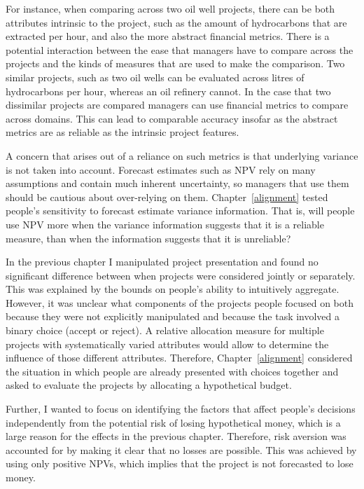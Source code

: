 \documentclass[a4paper, nobind, dvipsnames]{templates/ociamthesis}
\theoremstyle{definition}
\theoremstyle{definition}
\theoremstyle{definition}
\theoremstyle{definition}
\theoremstyle{remark}
\begin{document}
For instance, when comparing across two oil well projects, there can be both
attributes intrinsic to the project, such as the amount of hydrocarbons that are
extracted per hour, and also the more abstract financial metrics. There is a
potential interaction between the ease that managers have to compare across the
projects and the kinds of measures that are used to make the comparison. Two
similar projects, such as two oil wells can be evaluated across litres of
hydrocarbons per hour, whereas an oil refinery cannot. In the case that two
dissimilar projects are compared managers can use financial metrics to compare
across domains. This can lead to comparable accuracy insofar as the abstract
metrics are as reliable as the intrinsic project features.

A concern that arises out of a reliance on such metrics is that underlying
variance is not taken into account. Forecast estimates such as NPV rely on many
assumptions and contain much inherent uncertainty, so managers that use them
should be cautious about over-relying on them. Chapter~\ref{alignment} tested
people's sensitivity to forecast estimate variance information. That is, will
people use NPV more when the variance information suggests that it is a reliable
measure, than when the information suggests that it is unreliable?

In the previous chapter I manipulated project presentation and found no
significant difference between when projects were considered jointly or
separately. This was explained by the bounds on people's ability to intuitively
aggregate. However, it was unclear what components of the projects people
focused on both because they were not explicitly manipulated and because the
task involved a binary choice (accept or reject). A relative allocation measure
for multiple projects with systematically varied attributes would allow to
determine the influence of those different attributes. Therefore,
Chapter~\ref{alignment} considered the situation in which people are already
presented with choices together and asked to evaluate the projects by allocating
a hypothetical budget.

Further, I wanted to focus on identifying the factors that affect people's
decisions independently from the potential risk of losing hypothetical money,
which is a large reason for the effects in the previous chapter. Therefore, risk
aversion was accounted for by making it clear that no losses are possible. This
was achieved by using only positive NPVs, which implies that the project is not
forecasted to lose money.
\end{document}
